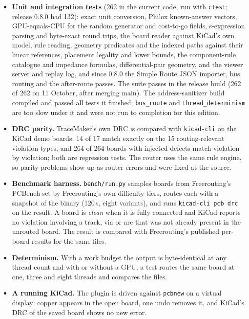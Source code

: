 \documentclass[10pt,a4paper]{article}
\begin{document}
\begin{itemize}[leftmargin=*]
  \item \textbf{Unit and integration tests} (262 in the current code, run with \texttt{ctest}; release 0.8.0 had 132): exact unit conversion, Philox known-answer vectors, GPU-equals-CPU for the random generator and
  cost-to-go fields, s-expression parsing and byte-exact round trips, the board reader against KiCad's own model,
  rule reading, geometry predicates and the indexed paths against their linear references, placement legality and
  lower bounds, the component-rule catalogue and impedance formulas, differential-pair geometry, and the viewer
  server and replay log, and since 0.8.0 the Simple Route JSON importer, bus routing and the after-route passes.
  The suite passes in the release build (262 of 262 on 11 October, after merging main). The address-sanitizer build compiled and passed
  all tests it finished; \texttt{bus\_route} and \texttt{thread\_determinism} are too slow under it and were not run to
  completion for this edition.
  \item \textbf{DRC parity.} TraceMaker's own DRC is compared with \texttt{kicad-cli} on the KiCad demo boards: 14
  of 17 match exactly on the 15 routing-relevant violation types, and 264 of 264 boards with injected defects match
  violation by violation; both are regression tests. The router uses the same rule engine, so parity problems show
  up as router errors and were fixed at the source.
  \item \textbf{Benchmark harness.} \texttt{bench/run.py} samples boards from Freerouting's PCBench set by
  Freerouting's own difficulty tiers, routes each with a snapshot of the binary (120\,s, eight variants), and runs
  \texttt{kicad-cli pcb drc} on the result. A board is \emph{clean} when it is fully connected and KiCad reports no
  violation involving a track, via or arc that was not already present in the unrouted board. The result is
  compared with Freerouting's published per-board results for the same files.
  \item \textbf{Determinism.} With a work budget the output is byte-identical at any thread count and with or
  without a GPU; a test routes the same board at one, three and eight threads and compares the files.
  \item \textbf{A running KiCad.} The plugin is driven against \texttt{pcbnew} on a virtual display: copper appears
  in the open board, one undo removes it, and KiCad's DRC of the saved board shows no new error.
\end{itemize}
\end{document}
